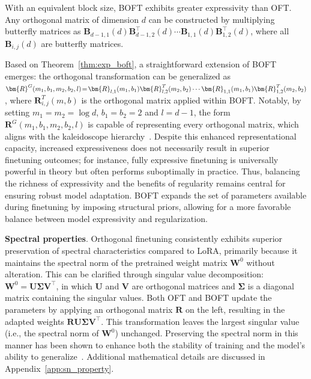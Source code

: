 \begin{theorem}\label{thm:exp_boft}
    With an equivalent block size, BOFT exhibits greater expressivity than OFT. Any orthogonal matrix of dimension $d$ can be constructed by multiplying butterfly matrices as $\bm{B}_{d-1,1}(d)\bm{B}^\top_{d-1,2}(d)\cdots\bm{B}_{1,1}(d)\bm{B}^\top_{1,2}(d)$, where all $\bm{B}_{i,j}(d)$ are butterfly matrices.
\end{theorem}

Based on Theorem~\ref{thm:exp_boft}, a straightforward extension of BOFT emerges: the orthogonal transformation can be generalized as $\thickmuskip=2mu \medmuskip=2mu \bm{R}^G(m_1,b_1,m_2,b_2,l)=\bm{R}_{l,1}(m_1,b_1)\bm{R}_{l,2}^T(m_2,b_2)\cdots\bm{R}_{1,1}(m_1,b_1)\bm{R}_{1,2}^T(m_2,b_2)$, where $\bm{R}_{i,j}^T(m,b)$ is the orthogonal matrix applied within BOFT. Notably, by setting $m_1=m_2=\log d$, $b_1=b_2=2$ and $l=d-1$, the form $\bm{R}^G(m_1,b_1,m_2,b_2,l)$ is capable of representing every orthogonal matrix, which aligns with the kaleidoscope hierarchy~\cite{dao2019kaleidoscope}. Despite this enhanced representational capacity, increased expressiveness does not necessarily result in superior finetuning outcomes; for instance, fully expressive finetuning is universally powerful in theory but often performs suboptimally in practice. Thus, balancing the richness of expressivity and the benefits of regularity remains central for ensuring robust model adaptation. BOFT expands the set of parameters available during finetuning by imposing structural priors, allowing for a more favorable balance between model expressivity and regularization.

\textbf{Spectral properties}. Orthogonal finetuning consistently exhibits superior preservation of spectral characteristics compared to LoRA, primarily because it maintains the spectral norm of the pretrained weight matrix $\bm{W}^0$ without alteration. This can be clarified through singular value decomposition: $\bm{W}^0=\bm{U}\bm{\Sigma}\bm{V}^\top$, in which $\bm{U}$ and $\bm{V}$ are orthogonal matrices and $\bm{\Sigma}$ is a diagonal matrix containing the singular values. Both OFT and BOFT update the parameters by applying an orthogonal matrix $\bm{R}$ on the left, resulting in the adapted weights $\bm{R}\bm{U}\bm{\Sigma}\bm{V}^\top$. This transformation leaves the largest singular value (i.e., the spectral norm of $\bm{W}^0$) unchanged. Preserving the spectral norm in this manner has been shown to enhance both the stability of training and the model’s ability to generalize~\cite{miyato2018spectral,yoshida2017spectral}. Additional mathematical details are discussed in Appendix~\ref{app:sn_property}.

